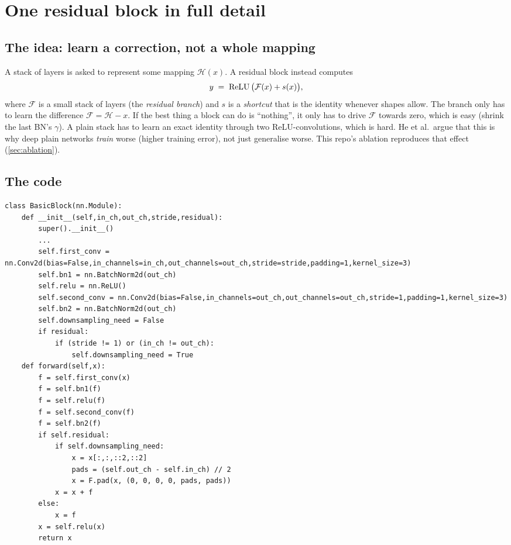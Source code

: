 \section{One residual block in full detail}
\label{sec:block}

\subsection{The idea: learn a correction, not a whole mapping}

\begin{idea}
A stack of layers is asked to represent some mapping $\mathcal H(x)$. A residual block instead computes
\[
  y \;=\; \operatorname{ReLU}\big(\mathcal F(x) + s(x)\big),
\]
where $\mathcal F$ is a small stack of layers (the \emph{residual branch}) and $s$ is a \emph{shortcut} that is the identity whenever shapes allow. The branch only has to learn the difference $\mathcal F = \mathcal H - x$. If the best thing a block can do is ``nothing'', it only has to drive $\mathcal F$ towards zero, which is easy (shrink the last BN's $\gamma$). A plain stack has to learn an exact identity through two ReLU-convolutions, which is hard. He et al.\ argue that this is why deep plain networks \emph{train} worse (higher training error), not just generalise worse. This repo's ablation reproduces that effect (\cref{sec:ablation}).
\end{idea}

\subsection{The code}

\begin{lstlisting}[firstnumber=6]
class BasicBlock(nn.Module):
    def __init__(self,in_ch,out_ch,stride,residual):
        super().__init__()
        ...
        self.first_conv = nn.Conv2d(bias=False,in_channels=in_ch,out_channels=out_ch,stride=stride,padding=1,kernel_size=3)
        self.bn1 = nn.BatchNorm2d(out_ch)
        self.relu = nn.ReLU()
        self.second_conv = nn.Conv2d(bias=False,in_channels=out_ch,out_channels=out_ch,stride=1,padding=1,kernel_size=3)
        self.bn2 = nn.BatchNorm2d(out_ch)
        self.downsampling_need = False
        if residual:
            if (stride != 1) or (in_ch != out_ch):
                self.downsampling_need = True
    def forward(self,x):
        f = self.first_conv(x)
        f = self.bn1(f)
        f = self.relu(f)
        f = self.second_conv(f)
        f = self.bn2(f)
        if self.residual:
            if self.downsampling_need:
                x = x[:,:,::2,::2]
                pads = (self.out_ch - self.in_ch) // 2
                x = F.pad(x, (0, 0, 0, 0, pads, pads))
            x = x + f
        else:
            x = f
        x = self.relu(x)
        return x
\end{lstlisting}


